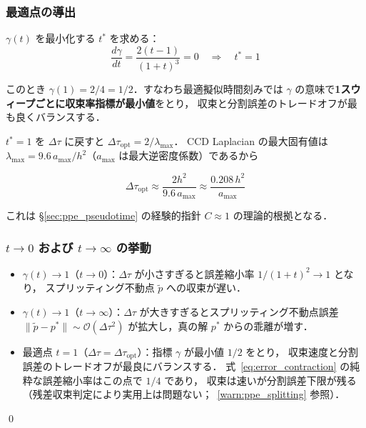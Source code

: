 \subsubsection*{最適点の導出}

$\gamma(t)$ を最小化する $t^*$ を求める：
\begin{equation}
  \frac{d\gamma}{dt} = \frac{2(t-1)}{(1+t)^3} = 0
  \quad\Longrightarrow\quad t^* = 1
\end{equation}

このとき $\gamma(1) = 2/4 = 1/2$．すなわち最適擬似時間刻みでは
$\gamma$ の意味で\textbf{1スウィープごとに収束率指標が最小値}をとり，
収束と分割誤差のトレードオフが最も良くバランスする．

$t^* = 1$ を $\Delta\tau$ に戻すと $\Delta\tau_{\mathrm{opt}} = 2/\lambda_{\max}$．
CCD Laplacian の最大固有値は $\lambda_{\max} = 9.6\,a_{\max}/h^2$（$a_{\max}$ は最大逆密度係数）であるから

\begin{equation}
  \Delta\tau_{\mathrm{opt}} \approx \frac{2h^2}{9.6\,a_{\max}}
                             \approx \frac{0.208\,h^2}{a_{\max}}
  \label{eq:dtau_opt_derive}
\end{equation}

これは §\ref{sec:ppe_pseudotime} の経験的指針 $C \approx 1$ の理論的根拠となる．

\subsubsection*{\texorpdfstring{$t \to 0$}{t → 0} および \texorpdfstring{$t \to \infty$}{t → ∞} の挙動}

\begin{itemize}
  \item $\gamma(t) \to 1$（$t \to 0$）：$\Delta\tau$ が小さすぎると誤差縮小率 $1/(1+t)^2 \to 1$ となり，
        スプリッティング不動点 $\tilde{p}$ への収束が遅い．
  \item $\gamma(t) \to 1$（$t \to \infty$）：$\Delta\tau$ が大きすぎるとスプリッティング不動点誤差
        $\|\tilde{p} - p^*\| \sim \mathcal{O}(\Delta\tau^2)$ が拡大し，真の解 $p^*$ からの乖離が増す．
  \item 最適点 $t=1$（$\Delta\tau = \Delta\tau_{\mathrm{opt}}$）：指標 $\gamma$ が最小値 $1/2$ をとり，
        収束速度と分割誤差のトレードオフが最良にバランスする．
        式~\eqref{eq:error_contraction} の純粋な誤差縮小率はこの点で $1/4$ であり，
        収束は速いが分割誤差下限が残る（残差収束判定により実用上は問題ない；~\ref{warn:ppe_splitting} 参照）．
\end{itemize}
\qed

